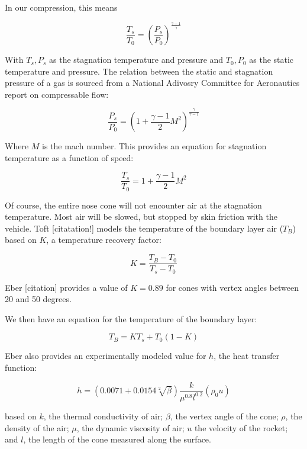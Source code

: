 \documentclass[twocolumn]{article}
\begin{document}
            In our compression, this means 

            \[\frac{T_s}{T_0}=\left(\frac{P_s}{P_0}\right)^\frac{\gamma-1}{\gamma}\]

            With $T_s, P_s$ as the stagnation temperature and pressure and 
            $T_0, P_0$ as the static temperature and pressure. The relation 
            between the static and stagnation pressure of a gas is sourced from 
            a National Adivosry Committee for Aeronautics report on compressable 
            flow:

            \[\frac{P_s}{P_0} =\left(1+\frac{\gamma-1}{2}M^2\right)^{\frac{\gamma}{\gamma-1}}\]

            Where $M$ is the mach number. This provides an equation for
            stagnation temperature as a function of speed:

            \[\frac{T_s}{T_0}=1+\frac{\gamma-1}{2}M^2\]

            Of course, the entire nose cone will not encounter air at the
            stagnation temperature. Most air will be slowed, but stopped by skin 
            friction with the vehicle. Toft [citatation!]
            models the temperature of the boundary layer air ($T_B$) based on
            $K$, a temperature recovery factor:

            \[K=\frac{T_B-T_0}{T_s-T_0}\]

            Eber [citation] provides a value of $K=0.89$ for cones with vertex
            angles between 20 and 50 degrees.

            We then have an equation for the temperature of the boundary layer:

            \[T_B=KT_s+T_0\left(1-K\right)\]

            Eber also provides an experimentally modeled value for $h$, the heat
            transfer function:
            
            \[h=\left(0.0071+0.0154 \sqrt[2]{\beta}\right)\frac{k}{\mu^{0.8}l^{0.2}}\left(\rho_0 u\right)\]

            based on $k$, the thermal conductivity of air; $\beta$, the vertex 
            angle of the cone; $\rho$, the density of the air; $\mu$, the dynamic
            viscosity of air; $u$ the velocity of the rocket; and $l$, the 
            length of the cone measured along the surface. 
\end{document}
